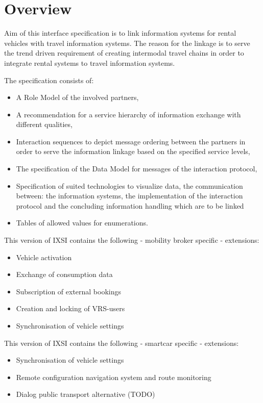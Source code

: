\chapter{Overview}
\label{cha:Zusammenfassung}

Aim of this interface specification is to link information systems for rental vehicles with travel information systems.
The reason for the linkage is to serve the trend driven requirement of creating intermodal travel chains in order to integrate rental systems to travel information systems.

The specification consists of:
\begin{itemize}
\item A Role Model of the involved partners,
\item A recommendation for a service hierarchy of information exchange with different qualities,
\item Interaction sequences to depict message ordering between the partners in order to serve the information linkage based on the specified service levels,
\item The specification of the Data Model for messages of the interaction protocol,
\item Specification of suited technologies to visualize data, the communication between: the information systems, the implementation of the interaction protocol and the concluding information handling which are to be linked
\item Tables of allowed values for enumerations.
\end{itemize}
This version of IXSI contains the following - mobility broker specific - extensions:
\begin{itemize}
	\item Vehicle activation 
	\item Exchange of consumption data 
	\item Subscription of external bookings
	\item Creation and locking of VRS-users
	\item Synchronisation of vehicle settings 
\end{itemize}
This version of IXSI contains the following -  smartcar specific - extensions:
\begin{itemize}
	\item Synchronisation of vehicle settings
	\item Remote configuration navigation system and route monitoring
	\item Dialog public transport alternative (TODO)
\end{itemize}

